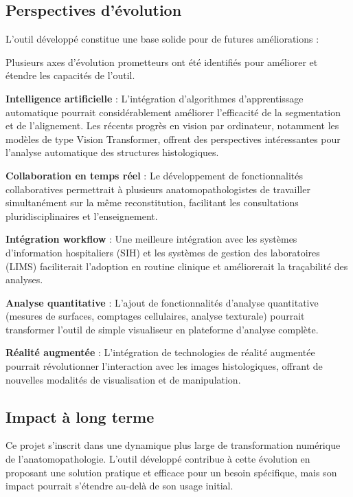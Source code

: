 \documentclass[12pt,a4paper]{report}
\begin{document}
\begin{}
\begin{}
\begin{}
\begin{}
\subsection{Perspectives d'évolution}

\begin{center}
L'outil développé constitue une base solide pour de futures améliorations :
\end{center}

\vspace{0.5em}

Plusieurs axes d'évolution prometteurs ont été identifiés pour améliorer et étendre les capacités de l'outil.

\textbf{Intelligence artificielle} : L'intégration d'algorithmes d'apprentissage automatique pourrait considérablement améliorer l'efficacité de la segmentation et de l'alignement. Les récents progrès en vision par ordinateur, notamment les modèles de type Vision Transformer, offrent des perspectives intéressantes pour l'analyse automatique des structures histologiques.

\textbf{Collaboration en temps réel} : Le développement de fonctionnalités collaboratives permettrait à plusieurs anatomopathologistes de travailler simultanément sur la même reconstitution, facilitant les consultations pluridisciplinaires et l'enseignement.

\textbf{Intégration workflow} : Une meilleure intégration avec les systèmes d'information hospitaliers (SIH) et les systèmes de gestion des laboratoires (LIMS) faciliterait l'adoption en routine clinique et améliorerait la traçabilité des analyses.

\textbf{Analyse quantitative} : L'ajout de fonctionnalités d'analyse quantitative (mesures de surfaces, comptages cellulaires, analyse texturale) pourrait transformer l'outil de simple visualiseur en plateforme d'analyse complète.

\textbf{Réalité augmentée} : L'intégration de technologies de réalité augmentée pourrait révolutionner l'interaction avec les images histologiques, offrant de nouvelles modalités de visualisation et de manipulation.

\subsection{Impact à long terme}

Ce projet s'inscrit dans une dynamique plus large de transformation numérique de l'anatomopathologie. L'outil développé contribue à cette évolution en proposant une solution pratique et efficace pour un besoin spécifique, mais son impact pourrait s'étendre au-delà de son usage initial.


\end{}
\end{}
\end{}
\end{}
\end{document}
